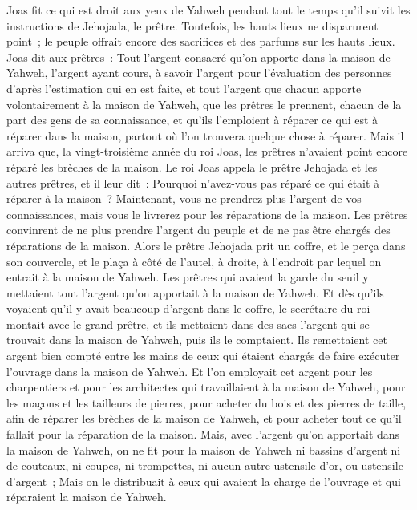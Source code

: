 \begin{multicols}{2}
Joas fit ce qui est droit aux yeux de Yahweh pendant tout le temps qu'il suivit les instructions de Jehojada, le prêtre.
Toutefois, les hauts lieux ne disparurent point~; le peuple offrait encore des sacrifices et des parfums sur les hauts lieux.
Joas dit aux prêtres~: Tout l'argent consacré qu'on apporte dans la maison de Yahweh, l'argent ayant cours, à savoir l'argent pour l'évaluation des personnes d'après l'estimation qui en est faite, et tout l'argent que chacun apporte volontairement à la maison de Yahweh,
que les prêtres le prennent, chacun de la part des gens de sa connaissance, et qu'ils l'emploient à réparer ce qui est à réparer dans la maison, partout où l'on trouvera quelque chose à réparer.
Mais il arriva que, la vingt-troisième année du roi Joas, les prêtres n'avaient point encore réparé les brèches de la maison.
Le roi Joas appela le prêtre Jehojada et les autres prêtres, et il leur dit~: Pourquoi n'avez-vous pas réparé ce qui était à réparer à la maison~? Maintenant, vous ne prendrez plus l'argent de vos connaissances, mais vous le livrerez pour les réparations de la maison.
Les prêtres convinrent de ne plus prendre l'argent du peuple et de ne pas être chargés des réparations de la maison.
Alors le prêtre Jehojada prit un coffre, et le perça dans son couvercle, et le plaça à côté de l'autel, à droite, à l'endroit par lequel on entrait à la maison de Yahweh. Les prêtres qui avaient la garde du seuil y mettaient tout l'argent qu'on apportait à la maison de Yahweh.
Et dès qu'ils voyaient qu'il y avait beaucoup d'argent dans le coffre, le secrétaire du roi montait avec le grand prêtre, et ils mettaient dans des sacs l'argent qui se trouvait dans la maison de Yahweh, puis ils le comptaient.
Ils remettaient cet argent bien compté entre les mains de ceux qui étaient chargés de faire exécuter l'ouvrage dans la maison de Yahweh. Et l'on employait cet argent pour les charpentiers et pour les architectes qui travaillaient à la maison de Yahweh,
pour les maçons et les tailleurs de pierres, pour acheter du bois et des pierres de taille, afin de réparer les brèches de la maison de Yahweh, et pour acheter tout ce qu'il fallait pour la réparation de la maison.
Mais, avec l'argent qu'on apportait dans la maison de Yahweh, on ne fit pour la maison de Yahweh ni bassins d'argent ni de couteaux, ni coupes, ni trompettes, ni aucun autre ustensile d'or, ou ustensile d'argent~;
Mais on le distribuait à ceux qui avaient la charge de l'ouvrage et qui réparaient la maison de Yahweh.

\end{multicols}
